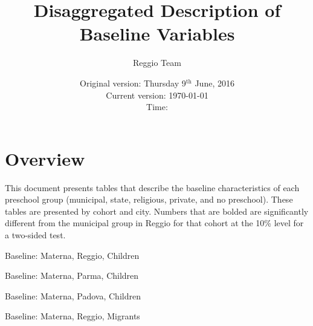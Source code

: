 \documentclass[11pt]{article}
\begin{document}
\title{Disaggregated Description of Baseline Variables}
\author{Reggio Team}
\date{Original version: Thursday  9$^{\text{th}}$ June, 2016 \\ Current version: \today \\ \vspace{1em} Time: \currenttime}
\maketitle

\listoftables

\section*{Overview}

This document presents tables that describe the baseline characteristics of each preschool group (municipal, state, religious, private, and no preschool). These tables are presented by cohort and city. Numbers that are bolded are significantly different from the municipal group in Reggio for that cohort at the 10\% level for a two-sided test. 

\begin{table}[htbp]
\begin{center}
	\caption{Baseline: Materna, Reggio, Children}
	
\end{center}
\end{table}

\begin{table}[htbp]
\begin{center}
	\caption{Baseline: Materna, Parma, Children}
	
\end{center}
\end{table}

\begin{table}[htbp]
\begin{center}
	\caption{Baseline: Materna, Padova, Children}
	
\end{center}
\end{table}


\begin{table}[htbp]
\begin{center}
	\caption{Baseline: Materna, Reggio, Migrants}
	
\end{center}
\end{table}
\end{document}

